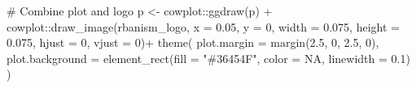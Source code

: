 \documentclass[
  letterpaper,
  DIV=11,
  numbers=noendperiod]{scrartcl}
\newenvironment{Shaded}{\begin{snugshade}}{\end{snugshade}}
\newcommand{\AttributeTok}[1]{\textcolor[rgb]{0.40,0.45,0.13}{#1}}
\newcommand{\CommentTok}[1]{\textcolor[rgb]{0.37,0.37,0.37}{#1}}
\newcommand{\ConstantTok}[1]{\textcolor[rgb]{0.56,0.35,0.01}{#1}}
\newcommand{\DecValTok}[1]{\textcolor[rgb]{0.68,0.00,0.00}{#1}}
\newcommand{\FloatTok}[1]{\textcolor[rgb]{0.68,0.00,0.00}{#1}}
\newcommand{\FunctionTok}[1]{\textcolor[rgb]{0.28,0.35,0.67}{#1}}
\newcommand{\NormalTok}[1]{\textcolor[rgb]{0.00,0.23,0.31}{#1}}
\newcommand{\OtherTok}[1]{\textcolor[rgb]{0.00,0.23,0.31}{#1}}
\newcommand{\SpecialCharTok}[1]{\textcolor[rgb]{0.37,0.37,0.37}{#1}}
\newcommand{\StringTok}[1]{\textcolor[rgb]{0.13,0.47,0.30}{#1}}
\begin{document}
\begin{Shaded}
\begin{Highlighting}[]
\CommentTok{\# Combine plot and logo}
\NormalTok{p }\OtherTok{\textless{}{-}}\NormalTok{ cowplot}\SpecialCharTok{::}\FunctionTok{ggdraw}\NormalTok{(p) }\SpecialCharTok{+}
\NormalTok{  cowplot}\SpecialCharTok{::}\FunctionTok{draw\_image}\NormalTok{(rbanism\_logo, }\AttributeTok{x =} \FloatTok{0.05}\NormalTok{, }\AttributeTok{y =} \DecValTok{0}\NormalTok{, }\AttributeTok{width =} \FloatTok{0.075}\NormalTok{, }\AttributeTok{height =} \FloatTok{0.075}\NormalTok{, }\AttributeTok{hjust =} \DecValTok{0}\NormalTok{, }\AttributeTok{vjust =} \DecValTok{0}\NormalTok{)}\SpecialCharTok{+}
  \FunctionTok{theme}\NormalTok{(}
    \AttributeTok{plot.margin =} \FunctionTok{margin}\NormalTok{(}\FloatTok{2.5}\NormalTok{, }\DecValTok{0}\NormalTok{, }\FloatTok{2.5}\NormalTok{, }\DecValTok{0}\NormalTok{),}
    \AttributeTok{plot.background =} \FunctionTok{element\_rect}\NormalTok{(}\AttributeTok{fill =} \StringTok{"\#36454F"}\NormalTok{,}
                                   \AttributeTok{color =} \ConstantTok{NA}\NormalTok{,}
                                   \AttributeTok{linewidth =} \FloatTok{0.1}\NormalTok{)}
\NormalTok{  )}
\end{Highlighting}
\end{Shaded}
\end{document}

